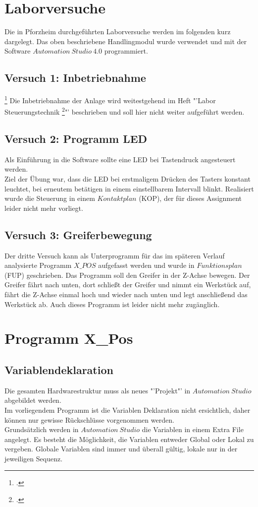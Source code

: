 \documentclass[12pt,a4paper]{scrartcl}	%
\begin{document}
\section{Laborversuche}
Die in Pforzheim durchgeführten Laborversuche werden im folgenden kurz dargelegt. Das oben beschriebene Handlingmodul wurde verwendet und mit der Software $Automation~Studio~4.0$ programmiert.
\subsection{Versuch 1: Inbetriebnahme}
\footcitetext[vgl.][S 12]{Labor}
Die Inbetriebnahme der Anlage wird weitestgehend im Heft "'Labor Steuerungstechnik \footcite[vgl.][S. 17\psqq] {VDI}"' beschrieben und soll hier nicht weiter aufgeführt werden.\\
\subsection{Versuch 2: Programm LED}
Als Einführung in die Software sollte eine LED bei Tastendruck angesteuert werden.\\
Ziel der Übung war, dass die LED bei erstmaligem Drücken des Tasters konstant leuchtet, bei erneutem betätigen in einem einstellbarem Intervall blinkt. Realisiert wurde die Steuerung in einem $Kontaktplan$ (KOP), der für dieses Assignment leider nicht mehr vorliegt.
\subsection{Versuch 3: Greiferbewegung} \label{greifer}
Der dritte Versuch kann als Unterprogramm für das im späteren Verlauf analysierte Programm $X\_POS$ aufgefasst werden und wurde in $Funktionsplan$ (FUP) geschrieben. Das Programm soll den Greifer in der Z-Achse bewegen. Der Greifer fährt nach unten, dort schließt der Greifer und nimmt ein Werkstück auf, fährt die Z-Achse einmal hoch und wieder nach unten und legt anschließend das Werkstück ab. Auch dieses Programm ist leider nicht mehr zugänglich.
\section{Programm X\_Pos}
\subsection{Variablendeklaration}
Die gesamten Hardwarestruktur muss als neues "'Projekt"' in $Automation~Studio$ abgebildet werden.\\
Im vorliegendem Programm ist die Variablen Deklaration nicht ersichtlich, daher können nur gewisse Rückschlüsse vorgenommen werden.\\
Grundsätzlich werden in $Automation~Studio$ die Variablen in einem Extra File angelegt.  Es besteht die Möglichkeit, die Variablen entweder Global oder Lokal zu vergeben. Globale Variablen sind immer und überall gültig, lokale nur in der jeweiligen Sequenz.
\end{document}
